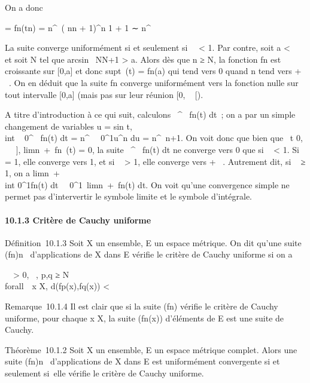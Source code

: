 On a donc

\mun = fn(tn) =
n^\alpha~\left ( n\over n +
1\right )^n 1\over
\sqrtn + 1 ∼ n^\alpha~\over
\sqrte\sqrtn

La suite converge uniformément si et seulement si~\alpha~ \textless{}
1. Par contre, soit a \textless{}
\pi~ et soit N tel que
arcsin~ \sqrt
N\over N+1 \textgreater{} a. Alors dès que n ≥ N,
la fonction fn est croissante sur {[}0,a{]} et donc
supt\leqafn~(t) =
fn(a) qui tend vers 0 quand n tend vers + \infty~. On en déduit que
la suite fn converge uniformément vers la fonction nulle sur
tout intervalle {[}0,a{]} (mais pas sur leur réunion {[}0,
\pi~ {[}).

A titre d'introduction à ce qui suit, calculons
~^\pi~ fn(t) dt~; on a par un simple changement de variables u
= sin t, \\int ~
0^\pi~ fn(t) dt =
n^\alpha~\int ~
0^1u^n du =
n^\alpha~\over n+1. On voit donc que bien que
\forall~t \in {[}0, \pi~~ {]},
limn\rightarrow~+\infty~fn~(t) = 0, la suite
~^\pi~ fn(t) dt ne converge vers 0 que si \alpha~ \textless{} 1. Si \alpha~
= 1, elle converge vers 1, et si \alpha~ \textgreater{} 1, elle converge vers
+ \infty~. Autrement dit, si \alpha~ ≥ 1, on a
limn\rightarrow~+\infty~~\\int
 0^1fn(t)
dt\neq~\int ~
0^1\
limn\rightarrow~+\infty~fn(t) dt. On voit qu'une convergence simple
ne permet pas d'intervertir le symbole limite et le symbole d'intégrale.

\paragraph{10.1.3 Critère de Cauchy uniforme}

Définition~10.1.3 Soit X un ensemble, E un espace métrique. On dit
qu'une suite (fn)n\in\mathbb{N}~ d'applications de X dans E
vérifie le critère de Cauchy uniforme si on a

\forall~~\epsilon \textgreater{} 0,
\existsN \in {}~, p,q ≥ N \rigtharrow~\\forall~~x
\in X, d(fp(x),fq(x)) \textless{} \epsilon

Remarque~10.1.4 Il est clair que si la suite (fn) vérifie le
critère de Cauchy uniforme, pour chaque x \in X, la suite
(fn(x)) d'éléments de E est une suite de Cauchy.

Théorème~10.1.2 Soit X un ensemble, E un espace métrique complet. Alors
une suite (fn)n\in\mathbb{N}~ d'applications de X dans E est
uniformément convergente si et seulement si~elle vérifie le critère de
Cauchy uniforme.

